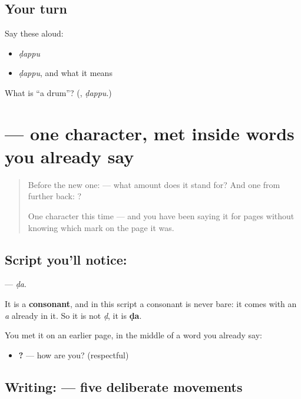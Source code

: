 \subsection*{Your turn}
Say these aloud:

\begin{itemize}
\raggedright
  \item \emph{ḍappu}
  \item \emph{ḍappu}, and what it means
\end{itemize}

\begin{tcolorbox}[breakable,colback=teal!4,colframe=teal!35!black,title={Before you move on}]
What is \textquotedblleft{}a drum\textquotedblright{}? (\textbf{}, \emph{ḍappu}.)
\end{tcolorbox}
\section[\texorpdfstring{\te{డ} (ḍa)}{డ (ḍa)}]{ — one character, met inside words you already say}

\label{lesson:TE-S123-letter-dda}



\begin{quote}
Before the new one:  — what amount does it stand for? And one from further back: ?

One character this time — and you have been saying it for pages without knowing which mark on the page it was.
\end{quote}

\subsection*{Script you'll notice: }
\textbf{} — \emph{ḍa}.

It is a \textbf{consonant}, and in this script a consonant is never bare: it comes with an \emph{a} already in it. So it is not \emph{ḍ}, it is \textbf{ḍa}.

You met it on an earlier page, in the middle of a word you already say:

\begin{itemize}
\raggedright
  \item \textbf{  ?} — how are you? (respectful)
\end{itemize}

\subsection*{Writing:  — five deliberate movements}

